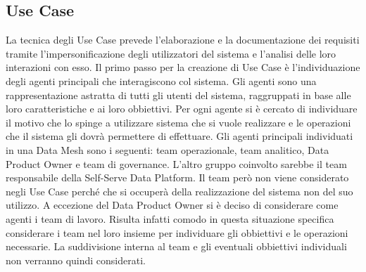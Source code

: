 \documentclass[a4paper,12pt]{report}
\begin{document}
\subsection{Use Case}
La tecnica degli Use Case prevede l'elaborazione e la documentazione dei requisiti tramite l'impersonificazione degli utilizzatori del sistema e l'analisi delle loro interazioni con esso. 
Il primo passo per la creazione di Use Case è l'individuazione degli agenti principali che interagiscono col sistema.
Gli agenti sono una rappresentazione astratta di tutti gli utenti del sistema, raggruppati in base alle loro caratteristiche e ai loro obbiettivi. 
Per ogni agente si è cercato di individuare il motivo che lo spinge a utilizzare sistema che si vuole realizzare e le operazioni che il sistema gli dovrà permettere di effettuare. 
Gli agenti principali individuati in una Data Mesh sono i seguenti: team operazionale, team analitico, Data Product Owner e team di governance.
L'altro gruppo coinvolto sarebbe il team responsabile della Self-Serve Data Platform.
Il team però non viene considerato negli Use Case perché che si occuperà della realizzazione del sistema non del suo utilizzo. 
A eccezione del Data Product Owner si è deciso di considerare come agenti i team di lavoro.
Risulta infatti comodo in questa situazione specifica considerare i team nel loro insieme per individuare gli obbiettivi e le operazioni necessarie. 
La suddivisione interna al team e gli eventuali obbiettivi individuali non verranno quindi considerati.
\end{document}
